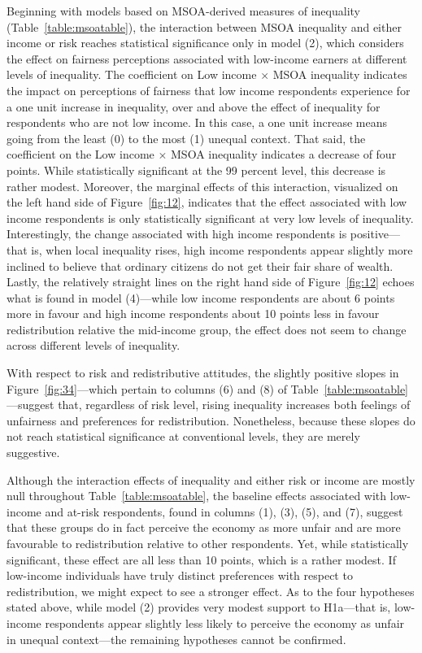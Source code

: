 \documentclass[12pt, letter]{scrartcl}
\begin{document}
Beginning with models based on MSOA-derived measures of inequality (Table~\ref{table:msoatable}), the interaction between MSOA inequality and either income or risk reaches statistical significance only in model (2), which considers the effect on fairness perceptions associated with low-income earners at different levels of inequality. The coefficient on Low income $\times$ MSOA inequality indicates the impact on perceptions of fairness that low income respondents experience for a one unit increase in inequality, over and above the effect of inequality for respondents who are not low income. In this case, a one unit increase means going from the least (0) to the most (1) unequal context. That said, the coefficient on the Low income $\times$ MSOA inequality indicates a decrease of four points. While statistically significant at the 99 percent level, this decrease is rather modest. Moreover, the marginal effects of this interaction, visualized on the left hand side of Figure~\ref{fig:12}, indicates that the effect associated with low income respondents is only statistically significant at very low levels of inequality. Interestingly, the change associated with high income respondents is positive---that is, when local inequality rises, high income respondents appear slightly more inclined to believe that ordinary citizens do not get their fair share of wealth. Lastly, the relatively straight lines on the right hand side of Figure~\ref{fig:12} echoes what is found in model (4)---while low income respondents are about 6 points more in favour and high income respondents about 10 points less in favour redistribution relative the mid-income group, the effect does not seem to change across different levels of inequality. 

With respect to risk and redistributive attitudes, the slightly positive slopes in Figure~\ref{fig:34}---which pertain to columns (6) and (8) of Table~\ref{table:msoatable}---suggest that, regardless of risk level, rising inequality increases both feelings of unfairness and preferences for redistribution. Nonetheless, because these slopes do not reach statistical significance at conventional levels, they are merely suggestive. 

Although the interaction effects of inequality and either risk or income are mostly null throughout Table~\ref{table:msoatable}, the baseline effects associated with low-income and at-risk respondents, found in columns (1), (3), (5), and (7), suggest that these groups do in fact perceive the economy as more unfair and are more favourable to redistribution relative to other respondents. Yet, while statistically significant, these effect are all less than 10 points, which is a rather modest. If low-income individuals have truly distinct preferences with respect to redistribution, we might expect to see a stronger effect. As to the four hypotheses stated above, while model (2) provides very modest support to H1a---that is, low-income respondents appear slightly less likely to perceive the economy as unfair in unequal context---the remaining hypotheses cannot be confirmed.
\end{document}
